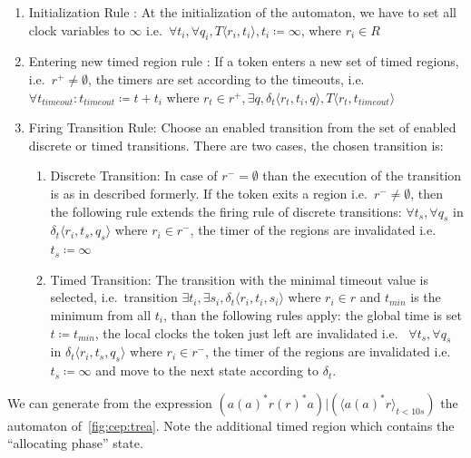 			\begin{enumerate}
				\item Initialization Rule : At the initialization  of the automaton, we have to set all clock variables to $\infty$ 
				i.e.~$\forall t_i, \forall q_i, T \langle r_i, t_i \rangle, t_i \coloneqq \infty $, where $r_i \in R$
				
				\item Entering new timed region rule :
				If a token enters a new set of timed regions, 
				i.e.~$r^+ \neq \emptyset$, 
				the timers are set according to the timeouts, 
				i.e.~$\forall t_{\textit{timeout}} : t_{\textit{timeout}} \coloneqq t + t_i $ where $ r_t \in r^+, \exists q ,\delta_t\langle  r_t,t_i,q \rangle, T \langle r_t, t_{\textit{timeout}} \rangle$
				
				\item Firing Transition Rule: Choose an enabled transition from the set of enabled discrete or timed transitions. 
				There are two cases, the chosen transition is:
				\begin{enumerate}
					\item Discrete Transition: In case of $r^- = \emptyset$ than the execution of the transition is as in described formerly. 
					If the token exits a region i.e.~$r^- \neq \emptyset$, 
					then the following rule extends the firing rule of discrete transitions:
					$\forall t_s, \forall q_s$ in $ \delta_t \langle r_i, t_s, q_s \rangle$ where $r_i \in r^-$, the timer of the regions are invalidated i.e.~	$t_s \coloneqq \infty$
					\item Timed Transition: The transition with the minimal timeout value is selected, 
					i.e.~transition $\exists t_i, \exists s_i, \delta_t \langle r_i, t_i, s_i \rangle$ where $ r_i \in r$ and $t_{\textit{min}}$ is the minimum from all $t_i$,
					than the following rules apply:
					the global time is set $t \coloneqq t_{\textit{min}}$, 
					the local clocks the token just left are invalidated i.e.~
					$\forall t_s, \forall q_s$ in $ \delta_t \langle r_i, t_s, q_s \rangle$ where $r_i \in r^-$, the timer of the regions are invalidated i.e.~$t_s \coloneqq \infty$ 
					and move to the next state according to $\delta_t$.
				\end{enumerate}			
			\end{enumerate}
			
			
			We can generate from the expression $(a (a)^\ast r (r)^\ast a)|( \langle a (a)^\ast r \rangle_{t < 10 s})$ the automaton of~\cref{fig:cep:trea}.
			Note the additional timed region which contains the ``allocating phase'' state.
			

